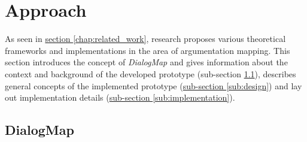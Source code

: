 \section{Approach}
\label{chap:approach}

As seen in \hyperref[chap:related_work]{section \ref{chap:related_work}}, research proposes various theoretical frameworks and implementations in the area of argumentation mapping. This section introduces the concept of \textit{DialogMap} and gives information about the context and background of the developed prototype (sub-section \ref{sub:dialogmap}), describes general concepts of the implemented prototype (\hyperref[sub:design]{sub-section \ref{sub:design}}) and lay out implementation details (\hyperref[sub:implementation]{sub-section \ref{sub:implementation}}).

\subsection{DialogMap}
\label{sub:dialogmap}


